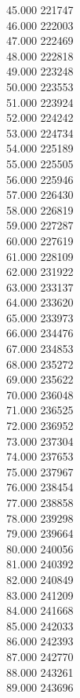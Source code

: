 { 45.000	221747 \\
 46.000	222003 \\
 47.000	222469 \\
 48.000	222818 \\
 49.000	223248 \\
 50.000	223553 \\
 51.000	223924 \\
 52.000	224242 \\
 53.000	224734 \\
 54.000	225189 \\
 55.000	225505 \\
 56.000	225946 \\
 57.000	226430 \\
 58.000	226819 \\
 59.000	227287 \\
 60.000	227619 \\
 61.000	228109 \\
 62.000	231922 \\
 63.000	233137 \\
 64.000	233620 \\
 65.000	233973 \\
 66.000	234476 \\
 67.000	234853 \\
 68.000	235272 \\
 69.000	235622 \\
 70.000	236048 \\
 71.000	236525 \\
 72.000	236952 \\
 73.000	237304 \\
 74.000	237653 \\
 75.000	237967 \\
 76.000	238454 \\
 77.000	238858 \\
 78.000	239298 \\
 79.000	239664 \\
 80.000	240056 \\
 81.000	240392 \\
 82.000	240849 \\
 83.000	241209 \\
 84.000	241668 \\
 85.000	242033 \\
 86.000	242393 \\
 87.000	242770 \\
 88.000	243261 \\
 89.000	243696 \\
}
